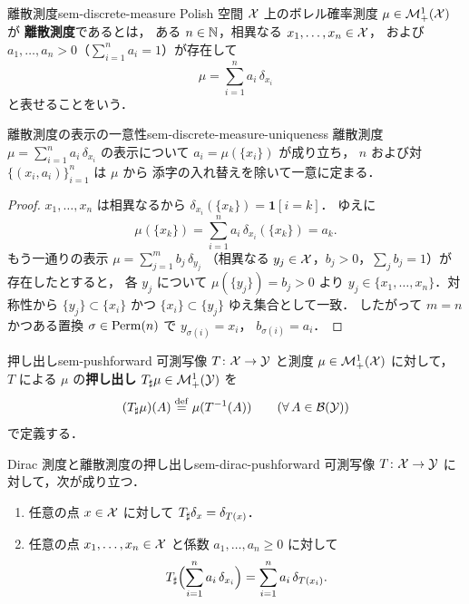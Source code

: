 \begin{definition}{離散測度}{sem-discrete-measure}
  Polish 空間 $\mathcal{X}$ 上のボレル確率測度 $\mu \in \mathcal{M}_+^1(\mathcal{X})$ が
  \textbf{離散測度}であるとは，
  ある $n \in \mathbb{N}$，相異なる $x_1, \ldots, x_n \in \mathcal{X}$，
  および $a_1, \ldots, a_n > 0$（$\sum_{i=1}^n a_i = 1$）が存在して
  \[
    \mu = \sum_{i=1}^{n} a_i\, \delta_{x_i}
  \]
  と表せることをいう．
\end{definition}

\begin{claim}{離散測度の表示の一意性}{sem-discrete-measure-uniqueness}
  離散測度 $\mu = \sum_{i=1}^{n} a_i\, \delta_{x_i}$ の表示について
  $a_i = \mu(\{x_i\})$ が成り立ち，
  $n$ および対 $\{(x_i, a_i)\}_{i=1}^{n}$ は $\mu$ から
  添字の入れ替えを除いて一意に定まる．
\end{claim}

\begin{proof}
  $x_1, \ldots, x_n$ は相異なるから
  $\delta_{x_i}(\{x_k\}) = \mathbf{1}[i = k]$．
  ゆえに
  \[
    \mu(\{x_k\}) = \sum_{i=1}^{n} a_i\, \delta_{x_i}(\{x_k\}) = a_k.
  \]
  もう一通りの表示
  $\mu = \sum_{j=1}^{m} b_j\, \delta_{y_j}$
  （相異なる $y_j \in \mathcal{X}$，$b_j > 0$，$\sum_j b_j = 1$）が存在したとすると，
  各 $y_j$ について $\mu(\{y_j\}) = b_j > 0$ より
  $y_j \in \{x_1, \ldots, x_n\}$．対称性から $\{y_j\} \subset \{x_i\}$ かつ
  $\{x_i\} \subset \{y_j\}$ ゆえ集合として一致．
  したがって $m = n$ かつある置換 $\sigma \in \operatorname{Perm}(n)$ で $y_{\sigma(i)} = x_i$，
  $b_{\sigma(i)} = a_i$．
\end{proof}

\begin{definition}{押し出し}{sem-pushforward}
  可測写像 $T \colon \mathcal{X} \to \mathcal{Y}$ と測度 $\mu \in \mathcal{M}_+^1(\mathcal{X})$ に対して，
  $T$ による $\mu$ の\textbf{押し出し} $T_\sharp \mu \in \mathcal{M}_+^1(\mathcal{Y})$ を
  \[
    (T_\sharp \mu)(A) \overset{\mathrm{def}}{=} \mu(T^{-1}(A))
    \qquad (\forall\, A \in \mathcal{B}(\mathcal{Y}))
  \]
  で定義する．
\end{definition}

\begin{proposition}{Dirac 測度と離散測度の押し出し}{sem-dirac-pushforward}
  可測写像 $T \colon \mathcal{X} \to \mathcal{Y}$ に対して，次が成り立つ．
  \begin{enumerate}
    \item[(i)] 任意の点 $x \in \mathcal{X}$ に対して
      $T_\sharp \delta_x = \delta_{T(x)}$．
    \item[(ii)] 任意の点 $x_1, \ldots, x_n \in \mathcal{X}$ と係数
      $a_1, \ldots, a_n \geq 0$ に対して
      \[
        T_\sharp \Bigl(\sum_{i=1}^{n} a_i\, \delta_{x_i}\Bigr)
        = \sum_{i=1}^{n} a_i\, \delta_{T(x_i)}.
      \]
  \end{enumerate}
\end{proposition}

